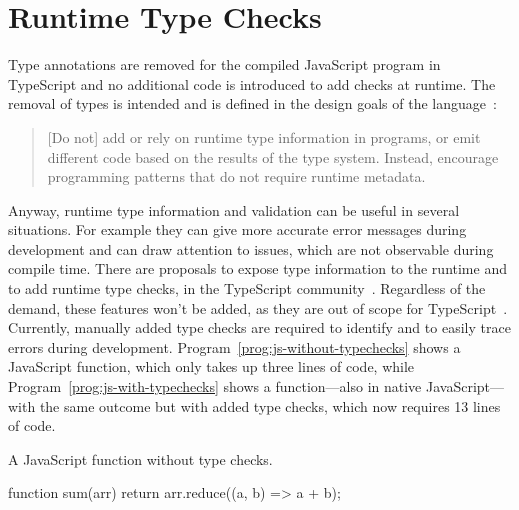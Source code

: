 \section{Runtime Type Checks}
\label{sec:runtime-type-checks}


Type annotations are removed for the compiled JavaScript program in TypeScript and no additional code is introduced to add checks at runtime. The removal of types is intended and is defined in the design goals of the language~\cite{TypeScriptWiki:DesignGoals}:
\begin{quote}
  [Do not] add or rely on runtime type information in programs,
  or emit different code based on the results of the type system.
  Instead, encourage programming patterns that do not require runtime metadata.
\end{quote}
Anyway, runtime type information and validation can be useful in several situations. 
For example they can give more accurate error messages during development and can 
draw attention to issues, which are not observable during compile time.
There are proposals to expose type information to the runtime and to add runtime type
checks, in the TypeScript community~\cites{TypeScriptIssue:RuntimeTypeChecking, TypeScriptIssue:RuntimeTypeChecks, TypeScriptIssue:EmitTypeArguments}. Regardless of the demand, these features won't be added, as they are out of scope
for TypeScript~\cite{TypeScriptIssue:RuntimeTypeChecking:Comment:OutOfScope, TypeScriptIssue:EmitTypeArguments:Comment:OutOfScope}.
Currently, manually added type checks are required to identify and to easily trace errors during development. Program~\ref{prog:js-without-typechecks} shows a JavaScript function, which only takes up three lines of code, while Program~\ref{prog:js-with-typechecks} shows a function---also in native JavaScript---with the same outcome but with added type checks, which now requires 13 lines of code.
\begin{program}
\caption{A JavaScript function without type checks.}
\label{prog:js-without-typechecks}
\begin{JsCode}
function sum(arr) {
  return arr.reduce((a, b) =>  a + b);
}
\end{JsCode}
\end{program}
